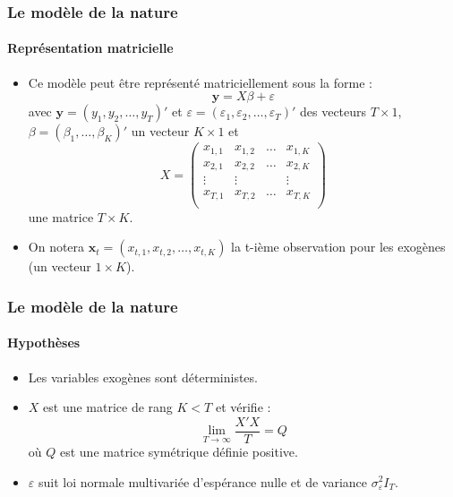 \documentclass[10pt]{beamer}
\begin{document}
\begin{frame}
  \frametitle{Le modèle de la nature}
  \framesubtitle{Représentation matricielle}

  \begin{itemize}

  \item Ce modèle peut être représenté matriciellement sous la forme :
    \[
      \mathbf y = X\beta + \varepsilon
    \]
    avec $\mathbf y = \left( y_1, y_2, \dots, y_T\right)'$ et $\varepsilon = \left( \varepsilon_1, \varepsilon_2, \dots, \varepsilon_T\right)'$ des vecteurs $T\times 1$, $\beta = \left( \beta_1, \dots, \beta_K \right)'$  un vecteur $K\times 1$ et
    \[
      X =
      \begin{pmatrix}
        x_{1,1} & x_{1,2} & \dots & x_{1,K} \\
        x_{2,1} & x_{2,2} & \dots & x_{2,K} \\
        \vdots  & \vdots  &       & \vdots  \\
        x_{T,1} & x_{T,2} & \dots & x_{T,K} \\
      \end{pmatrix}
    \]
    une matrice $T\times K$.\newline

    \item On notera $\mathbf x_t = (x_{t,1},x_{t,2}, \dots, x_{t,K})$ la t-ième observation pour les exogènes (un vecteur $1\times K$).

  \end{itemize}

\end{frame}


\begin{frame}
  \frametitle{Le modèle de la nature}
  \framesubtitle{Hypothèses}

  \begin{itemize}

  \item[$\mathcal H_1$] Les variables exogènes sont déterministes.\newline

    \bigskip\bigskip

  \item[$\mathcal H_2$] $X$ est une matrice de rang $K<T$ et vérifie :
    \[
      \lim_{T\rightarrow\infty} \frac{X'X}{T} = Q
    \]
    où $Q$ est une matrice symétrique définie positive.\newline

    \bigskip\bigskip

  \item[$\mathcal H_3$] $\varepsilon$ suit loi normale multivariée d'espérance nulle et de variance $\sigma_{\varepsilon}^2I_T$.
  \end{itemize}

\end{frame}
\end{document}
